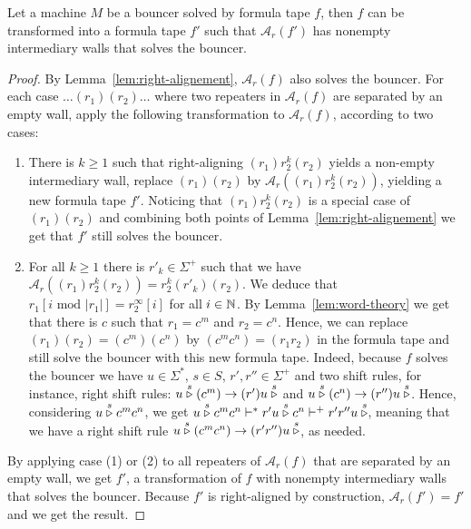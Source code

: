 \begin{lemma}\label{lem:formula-tapes-WLOG}
    Let a machine $M$ be a bouncer solved by formula tape $f$, then $f$ can be transformed into a formula tape $f'$ such that $\mathcal{A}_r(f')$ has nonempty intermediary walls that solves the bouncer.
\end{lemma}
\begin{proof}
    By Lemma~\ref{lem:right-alignement}, $\mathcal{A}_r(f)$ also solves the bouncer. For each case $\dots (r_1)(r_2) \dots$ where two repeaters in $\mathcal{A}_r(f)$ are separated by an empty wall, apply the following transformation to $\mathcal{A}_r(f)$, according to two cases:

    \begin{enumerate}
        \item There is $k\geq 1$ such that right-aligning $(r_1)r_2^k(r_2)$ yields a non-empty intermediary wall, replace $(r_1)(r_2)$ by $\mathcal{A}_r((r_1)r_2^k(r_2))$, yielding a new formula tape $f'$. Noticing that $(r_1)r_2^k(r_2)$ is a special case of $(r_1)(r_2)$ and combining both points of Lemma~\ref{lem:right-alignement} we get that $f'$ still solves the bouncer.

        \item For all $k\geq 1$ there is $r'_k\in\Sigma^+$ such that we have $\mathcal{A}_r((r_1)r_2^k(r_2)) = r_2^k (r'_k)(r_2)$. We deduce that $r_1[i \text{ mod } |r_1|] = r_2^\infty[i]$ for all $i\in\mathbb{N}$. By Lemma~\ref{lem:word-theory} we get that there is $c$ such that $r_1 = c^m$ and $r_2 = c^n$. Hence, we can replace $(r_1)(r_2) = (c^m)(c^n)$ by $(c^m c^n) = (r_1 r_2)$ in the formula tape and still solve the bouncer with this new formula tape. Indeed, because $f$ solves the bouncer we have $u \in\Sigma^*$, $s\in S$, $r', r'' \in \Sigma^+$ and two shift rules, for instance, right shift rules: $u \stackrel{s}\triangleright (c^m) \to (r') u \stackrel{s}\triangleright$ and $u \stackrel{s}\triangleright (c^n) \to (r'') u \stackrel{s}\triangleright$. Hence, considering $u  \stackrel{s}\triangleright c^m c^n$, we get $u  \stackrel{s}\triangleright c^m c^n \vdash^* r' u  \stackrel{s}\triangleright c^n \vdash^+ r' r'' u  \stackrel{s}\triangleright$, meaning that we have a right shift rule $u \stackrel{s}\triangleright (c^m c^n) \to (r'r'') u \stackrel{s}\triangleright$, as needed.

    \end{enumerate}

    By applying case (1) or (2) to all repeaters of $\mathcal{A}_r(f)$ that are separated by an empty wall, we get $f'$, a transformation of $f$ with nonempty intermediary walls that solves the bouncer. Because $f'$ is right-aligned by construction, $\mathcal{A}_r(f') = f'$  and we get the result.

\end{proof}


